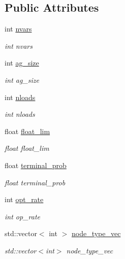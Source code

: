 \subsection*{Public Attributes}
\begin{DoxyCompactItemize}
\item 
int \hyperlink{classAcyclicGraphManipulator_a1daae08faa803d96d51c71911a543bde}{nvars}
\begin{DoxyCompactList}\small\item\em int nvars \end{DoxyCompactList}\item 
int \hyperlink{classAcyclicGraphManipulator_a1b0e2746882dd6cffae75018c831d99d}{ag\+\_\+size}
\begin{DoxyCompactList}\small\item\em int ag\+\_\+size \end{DoxyCompactList}\item 
int \hyperlink{classAcyclicGraphManipulator_abaabd6c4fb4cee6b7adfc3fc146fb395}{nloads}
\begin{DoxyCompactList}\small\item\em int nloads \end{DoxyCompactList}\item 
float \hyperlink{classAcyclicGraphManipulator_a6591f90b81ad497237fc80e923dae793}{float\+\_\+lim}
\begin{DoxyCompactList}\small\item\em float float\+\_\+lim \end{DoxyCompactList}\item 
float \hyperlink{classAcyclicGraphManipulator_a0b11805aca890b75517094e6afd98875}{terminal\+\_\+prob}
\begin{DoxyCompactList}\small\item\em float terminal\+\_\+prob \end{DoxyCompactList}\item 
int \hyperlink{classAcyclicGraphManipulator_ac6d1c55c9a9012663f66b3c027abef82}{opt\+\_\+rate}
\begin{DoxyCompactList}\small\item\em int op\+\_\+rate \end{DoxyCompactList}\item 
std\+::vector$<$ int $>$ \hyperlink{classAcyclicGraphManipulator_aa0e85eda232a3dd36fe170b5b67e5e57}{node\+\_\+type\+\_\+vec}
\begin{DoxyCompactList}\small\item\em std\+::vector$<$int$>$ node\+\_\+type\+\_\+vec \end{DoxyCompactList}\item 

\end{DoxyCompactItemize}
